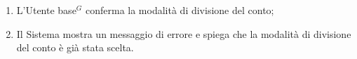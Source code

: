 \begin{itemize}
\begin{itemize}
\begin{enumerate}
					\item L'\gls{Utente base}$^G$ conferma la modalità di divisione del conto;
	
					\item Il Sistema mostra un messaggio di errore e spiega che la
						modalità di divisione del conto è già stata scelta.
				\end{enumerate}
		  \end{itemize}

\end{itemize}

